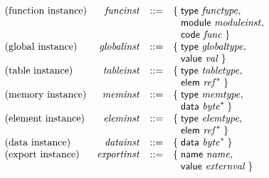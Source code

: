 \vspace{1ex}

\vspace{1ex}

$$
\begin{array}{@{}lrrl@{}l@{}}
\mbox{(function instance)} & {\mathit{funcinst}} &::=& \{\; \begin{array}[t]{@{}l@{}l@{}}
\mathsf{type}~{\mathit{functype}},\; \\
  \mathsf{module}~{\mathit{moduleinst}},\; \\
  \mathsf{code}~{\mathit{func}} \;\}\end{array} \\
\mbox{(global instance)} & {\mathit{globalinst}} &::=& \{\; \begin{array}[t]{@{}l@{}l@{}}
\mathsf{type}~{\mathit{globaltype}},\; \\
  \mathsf{value}~{\mathit{val}} \;\}\end{array} \\
\mbox{(table instance)} & {\mathit{tableinst}} &::=& \{\; \begin{array}[t]{@{}l@{}l@{}}
\mathsf{type}~{\mathit{tabletype}},\; \\
  \mathsf{elem}~{{\mathit{ref}}^\ast} \;\}\end{array} \\
\mbox{(memory instance)} & {\mathit{meminst}} &::=& \{\; \begin{array}[t]{@{}l@{}l@{}}
\mathsf{type}~{\mathit{memtype}},\; \\
  \mathsf{data}~{{\mathit{byte}}^\ast} \;\}\end{array} \\
\mbox{(element instance)} & {\mathit{eleminst}} &::=& \{\; \begin{array}[t]{@{}l@{}l@{}}
\mathsf{type}~{\mathit{elemtype}},\; \\
  \mathsf{elem}~{{\mathit{ref}}^\ast} \;\}\end{array} \\
\mbox{(data instance)} & {\mathit{datainst}} &::=& \{\; \begin{array}[t]{@{}l@{}l@{}}
\mathsf{data}~{{\mathit{byte}}^\ast} \;\}\end{array} \\
\mbox{(export instance)} & {\mathit{exportinst}} &::=& \{\; \begin{array}[t]{@{}l@{}l@{}}
\mathsf{name}~{\mathit{name}},\; \\
  \mathsf{value}~{\mathit{externval}} \;\}\end{array} \\

\end{array}$$
